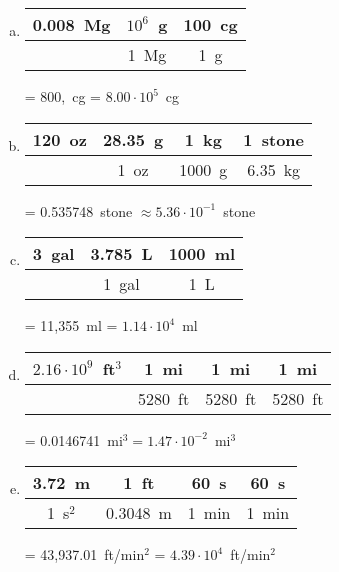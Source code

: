 \documentclass[11pt,letterpaper]{article}
\begin{document}
\sol 
\begin{enumerate}[(a)]
\item \phantom{.}\par
	\begin{table}[H]
	\centering
	\begin{tabular}{c||c|c}
	0.008~Mg & $10^6$~g & 100~cg \\ \hline
			&     1~Mg	    & 1~g
	\end{tabular} = 800,~cg = $8.00 \cdot 10^5$~cg
	\end{table} \pspace

\item \phantom{.}\par
	\begin{table}[H]
	\centering
	\begin{tabular}{c||c|c|c}
	120~oz & 28.35~g & 1~kg & 1~stone \\ \hline
		    & 1~oz 	     & 1000~g & 6.35~kg
	\end{tabular} = 0.535748~stone $\approx 5.36 \cdot 10^{-1}$~stone
	\end{table} \pspace
 
\item \phantom{.}\par
	\begin{table}[H]
	\centering
	\begin{tabular}{c||c|c}
	3~gal & 3.785~L & 1000~ml \\ \hline
		& 1~gal	  & 1~L
	\end{tabular} = 11,355~ml = $1.14 \cdot 10^4$~ml
	\end{table} \pspace
 
\item \phantom{.}\par
	\begin{table}[H]
	\centering
	\begin{tabular}{c||c|c|c}
	$2.16 \cdot 10^9$~ft$^3$ & 1~mi & 1~mi & 1~mi \\ \hline
						& 5280~ft & 5280~ft & 5280~ft
	\end{tabular} = 0.0146741~mi$^3= 1.47 \cdot 10^{-2}$~mi$^3$
	\end{table} \pspace
 
\item \phantom{.}\par
	\begin{table}[H]
	\centering
	\begin{tabular}{c||c|c|c}
	3.72~m   & 1~ft		 & 60~s & 60~s \\ \hline
	1~s$^2$ & 0.3048~m & 1~min & 1~min
	\end{tabular} = 43,937.01~ft/min$^2$ = $4.39 \cdot 10^4$~ft/min$^2$
	\end{table}  
\end{enumerate}
\end{document}
